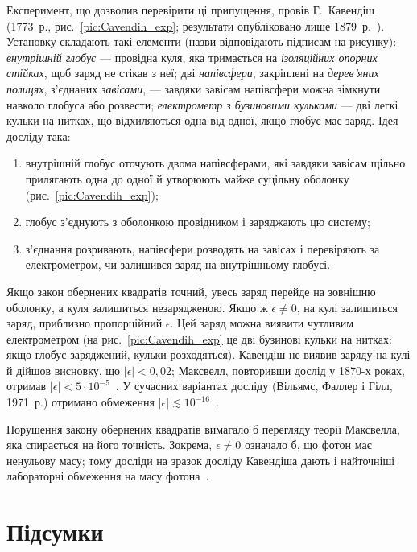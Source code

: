 Експеримент, що дозволив перевірити ці припущення, провів Г.~Кавендіш (1773~р.,
рис.~\ref{pic:Cavendih_exp}; результати опубліковано лише 1879~р.~\cite{Maxwell1879}). Установку складають такі елементи (назви відповідають
підписам на рисунку): \emph{внутрішній глобус} --- провідна куля, яка тримається на
\emph{ізоляційних опорних стійках}, щоб заряд не стікав з неї; дві \emph{напівсфери},
закріплені на \emph{дерев'яних полицях}, з'єднаних \emph{завісами}, --- завдяки завісам
напівсфери можна зімкнути навколо глобуса або розвести; \emph{електрометр з бузиновими
кульками} --- дві легкі кульки на нитках, що відхиляються одна від одної, якщо глобус
має заряд. Ідея досліду така:
\begin{enumerate}
	\item внутрішній глобус оточують двома напівсферами, які завдяки завісам щільно
	      прилягають одна до одної й утворюють майже суцільну оболонку
	      (рис.~\ref{pic:Cavendih_exp});
	\item глобус з'єднують з оболонкою провідником і заряджають цю систему;
	\item з'єднання розривають, напівсфери розводять на завісах і перевіряють за
	      електрометром, чи залишився заряд на внутрішньому глобусі.
\end{enumerate}
Якщо закон обернених квадратів точний, увесь заряд перейде на зовнішню оболонку, а куля
залишиться незарядженою. Якщо ж $\epsilon \neq 0$, на кулі залишиться заряд, приблизно
пропорційний $\epsilon$. Цей заряд можна виявити чутливим електрометром (на
рис.~\ref{pic:Cavendih_exp} це дві бузинові кульки на нитках: якщо глобус заряджений, кульки
розходяться). Кавендіш не виявив заряду на кулі й
дійшов висновку, що $|\epsilon| < 0{,}02$; Максвелл, повторивши дослід у 1870-х роках,
отримав $|\epsilon| < 5\cdot10^{-5}$~\cite[§~74]{Maxwell1873}. У сучасних варіантах досліду (Вільямс, Фаллер і
Гілл, 1971~р.) отримано обмеження $|\epsilon| \lesssim 10^{-16}$~\cite{Williams1971}.

\begin{Attention}[unbreakable]
	Порушення закону обернених квадратів вимагало б перегляду теорії Максвелла, яка
	спирається на його точність. Зокрема, $\epsilon \neq 0$ означало б, що фотон має
	ненульову масу; тому досліди на зразок досліду Кавендіша дають і найточніші
	лабораторні обмеження на масу фотона~\cite{Tu2005,Goldhaber2010}.
\end{Attention}


\section*{Підсумки}
 {}

